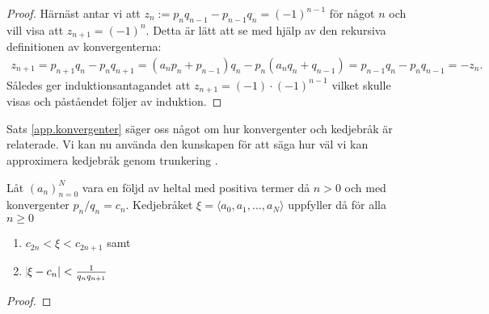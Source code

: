 \begin{proof}
    Härnäst antar vi att \(z_n := p_n q_{n-1} - p_{n-1} q_n = (-1)^{n-1}\) för något $n$ och vill visa att \(z_{n+1} = (-1)^{n}\). Detta är lätt att se med hjälp av den rekursiva definitionen av konvergenterna:
    \begin{align*}
        z_{n+1} = p_{n+1} q_{n} - p_{n} q_{n+1} = (a_n p_n + p_{n-1}) q_n - p_{n} (a_n q_n + q_{n-1}) = p_{n-1} q_n - p_n q_{n-1} = - z_n.
    \end{align*}
    Således ger induktionsantagandet att \(z_{n+1} = (-1) \cdot (-1)^{n-1}\) vilket skulle visas och påståendet följer av induktion. 
\end{proof}

Sats \ref{app.konvergenter} säger oss något om hur konvergenter och kedjebråk är relaterade. Vi kan nu använda den kunskapen för att säga hur väl vi kan approximera kedjebråk genom trunkering \cite[sats 20.9]{Lindahl}.

\begin{theorem} \label{app.kovfel}
    Låt \((a_n)_{n=0}^{N}\) vara en följd av heltal med positiva termer då \(n > 0\) och med konvergenter \(p_n / q_n = c_n\). Kedjebråket \(\xi = \langle a_0, a_1, \dots, a_N \rangle\) uppfyller då för alla \(n \geq 0\)
    \begin{enumerate}
        \item \(c_{2n} < \xi < c_{2n + 1}\) samt
        \item \(\abs{\xi - c_n} < \frac{1}{q_n q_{n + 1}}\) %
    \end{enumerate}
\end{theorem}
\begin{proof}
\end{proof}

